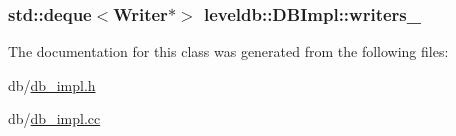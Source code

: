 \hypertarget{classleveldb_1_1_d_b_impl_a6f810e4d78d7cae052c365dfd3ceea7f}{
\subsubsection[{writers\-\_\-}]{\setlength{\rightskip}{0pt plus 5cm}std\-::deque$<${\bf Writer}$\ast$$>$ leveldb\-::\-D\-B\-Impl\-::writers\-\_\-\hspace{0.3cm}{\ttfamily [private]}}}\label{classleveldb_1_1_d_b_impl_a6f810e4d78d7cae052c365dfd3ceea7f}


The documentation for this class was generated from the following files\-:\begin{DoxyCompactItemize}
\item 
db/\hyperlink{db__impl_8h}{db\-\_\-impl.\-h}\item 
db/\hyperlink{db__impl_8cc}{db\-\_\-impl.\-cc}\end{DoxyCompactItemize}
